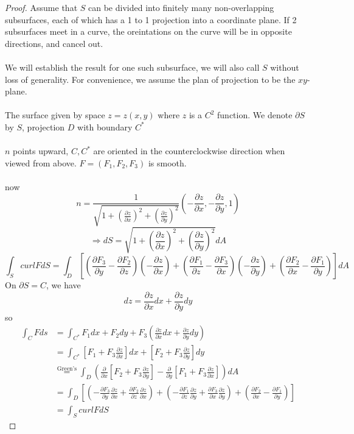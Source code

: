 \documentclass[12pt]{article}
\theoremstyle{plain}
\theoremstyle{definition}
\begin{document}
\begin{proof}
	Assume that $S$ can be divided into finitely many non-overlapping subsurfaces, each of which has a 1 to 1 projection into a coordinate plane. If 2 subsurfaces meet in a curve, the oreintations on the curve will be in opposite directions, and cancel out.\\
	\\
	We will establish the result for one such subsurface, we will also call $S$ without loss of generality. For convenience, we assume the plan of projection to be the $xy$-plane.\\
	\\
	The surface given by space $z=z(x,y)$ where $z$ is a $C^2$ function. We denote $\partial S$ by $S$, projection $D$ with boundary $C^*$\\
	\\
	$n$ points upward, $C, C^*$ are oriented in the counterclockwise direction when viewed from above. $F=(F_1, F_2, F_3)$ is smooth.\\
	\\
	now $$n = \frac{1}{\sqrt{1+(\frac{\partial z}{\partial x})^2 + (\frac{\partial z}{\partial y})^2}} (-\frac{\partial z}{\partial x}, -\frac{\partial z}{\partial y}, 1)$$
	$$\Longrightarrow dS = \sqrt{1+(\frac{\partial z}{\partial x})^2 + (\frac{\partial z}{\partial y})^2} dA$$
	$$\int_S curl F dS = \int_D [(\frac{\partial F_3}{\partial y} - \frac{\partial F_2}{\partial z})(-\frac{\partial z}{\partial x}) + (\frac{\partial F_1}{\partial z} - \frac{\partial F_3}{\partial x})(-\frac{\partial z}{\partial y}) + (\frac{\partial F_2}{\partial x} - \frac{\partial F_1}{\partial y})]dA$$
	On $\partial S = C$, we have
	$$dz = \frac{\partial z}{\partial x}dx + \frac{\partial z}{\partial y}dy$$
	so
	\begin{align*}
		\int_C F ds &= \int_{C^*} F_1 dx + F_2dy+F_3(\frac{\partial z}{\partial x}dx + \frac{\partial z}{\partial y}dy)\\
		&= \int_{C^*} [F_1 + F_3\frac{\partial z}{\partial x}]dx + [F_2 + F_3\frac{\partial z}{\partial y}]dy\\
		&\overset{\text{Green's}}{=} \int_D (\frac{\partial}{\partial x} [F_2 + F_3\frac{\partial z}{\partial y}] - \frac{\partial}{\partial y} [F_1 + F_3\frac{\partial z}{\partial x}])dA\\
		&= \int_D [(-\frac{\partial F_3}{\partial y}\frac{\partial z}{\partial x} + \frac{\partial F_2}{\partial z}\frac{\partial z}{\partial x}) + (-\frac{\partial F_1}{\partial z}\frac{\partial z}{\partial y} + \frac{\partial F_3}{\partial x}\frac{\partial z}{\partial y}) + (\frac{\partial F_2}{\partial x} - \frac{\partial F_1}{\partial y})]\\
		&= \int_S curl F dS
	\end{align*}
\end{proof}
\end{document}
